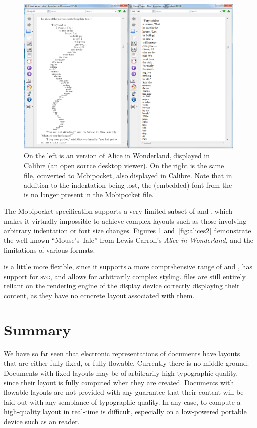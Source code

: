 \begin{figure}
\includegraphics[width=\textwidth]{gfx/alices1}
\caption[Document displayed in Calibre]{On the left is an \epub{} version of Alice in Wonderland, displayed in Calibre (an open source desktop \ebook{} viewer). On the right is the same file, converted to Mobipocket, also displayed in Calibre. Note that in addition to the indentation being lost, the (embedded) font from the \epub{} is no longer present in the Mobipocket file.}
\label{fig:alices1}
\end{figure}

The Mobipocket specification supports a very limited subset of \html{} and \css{}, which makes it virtually impossible to achieve complex layouts such as those involving arbitrary indentation or font size changes. Figures \ref{fig:alices1} and~\ref{fig:alices2} demonstrate the well known ``Mouse's Tale'' from Lewis Carroll's \emph{Alice in Wonderland}, and the limitations of various formats.


\epub{} is a little more flexible, since it supports a more comprehensive range of \xhtml{} and \css{}, has support for \textsc{svg}, and allows for arbitrarily complex styling. \epub{} files are still entirely reliant on the rendering engine of the display device correctly displaying their content, as they have no concrete layout associated with them.





\section{Summary}

We have so far seen that electronic representations of documents have layouts that are either fully fixed, or fully flowable. Currently there is no middle ground. Documents with fixed layouts may be of arbitrarily high typographic quality, since their layout is fully computed when they are created. Documents with flowable layouts are not provided with any guarantee that their content will be laid out with any semblance of typographic quality. In any case, to compute a high-quality layout in real-time is difficult, especially on a low-powered portable device such as an \ebook{} reader.

